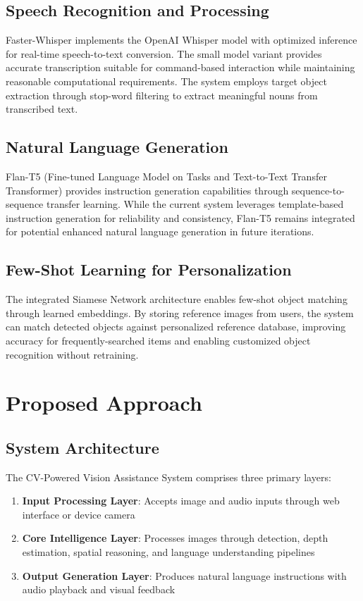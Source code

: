 \documentclass{article}
\begin{document}
\subsection{Speech Recognition and Processing}

Faster-Whisper implements the OpenAI Whisper model with optimized inference for real-time speech-to-text conversion. The small model variant provides accurate transcription suitable for command-based interaction while maintaining reasonable computational requirements. The system employs target object extraction through stop-word filtering to extract meaningful nouns from transcribed text.

\subsection{Natural Language Generation}

Flan-T5 (Fine-tuned Language Model on Tasks and Text-to-Text Transfer Transformer) provides instruction generation capabilities through sequence-to-sequence transfer learning. While the current system leverages template-based instruction generation for reliability and consistency, Flan-T5 remains integrated for potential enhanced natural language generation in future iterations.

\subsection{Few-Shot Learning for Personalization}

The integrated Siamese Network architecture enables few-shot object matching through learned embeddings. By storing reference images from users, the system can match detected objects against personalized reference database, improving accuracy for frequently-searched items and enabling customized object recognition without retraining.

\section{Proposed Approach}

\subsection{System Architecture}

The CV-Powered Vision Assistance System comprises three primary layers:

\begin{enumerate}
    \item \textbf{Input Processing Layer}: Accepts image and audio inputs through web interface or device camera
    \item \textbf{Core Intelligence Layer}: Processes images through detection, depth estimation, spatial reasoning, and language understanding pipelines
    \item \textbf{Output Generation Layer}: Produces natural language instructions with audio playback and visual feedback
\end{enumerate}
\end{document}
